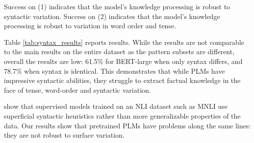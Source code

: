 Success on (1) indicates
that the model's knowledge processing is robust to syntactic
variation.
Success on (2) indicates
that the model's knowledge processing is robust to
variation in word order and tense.



Table \ref{tab:syntax_results}
reports results.
While the results are not comparable to the main results on
the entire dataset as the pattern subsets are different, overall
the results are low: 61.5\% for BERT-large when only 
syntax differs, and 78.7\% when syntax is
identical.  This demonstrates that while PLMs have impressive syntactic
abilities, 
they struggle to extract factual knowledge in the face of
tense, word-order and syntactic variation.


\citet{mccoy2019right}  show that supervised models trained on an NLI
dataset \cite{dagan-rte,snli} such as MNLI \cite{mnli} use
superficial syntactic heuristics rather than more
generalizable properties of the data.
Our results show that pretrained PLMs have  problems along
the same lines:
they are not robust to surface variation.

